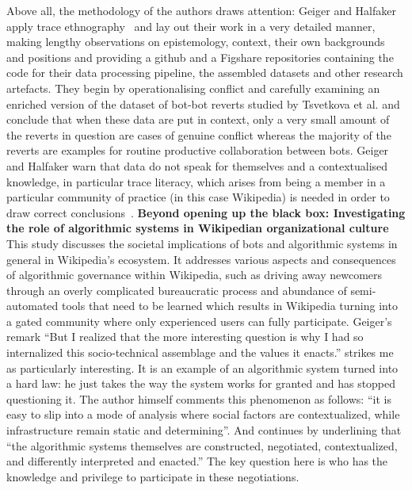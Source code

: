 \documentclass[pdftex,a4paper,11pt]{scrartcl}
\begin{document}
Above all, the methodology of the authors draws attention: Geiger and Halfaker apply trace ethnography~\cite{GeiRib2011} and lay out their work in a very detailed manner, making lengthy observations on epistemology, context, their own backgrounds and positions and providing a github and a Figshare repositories containing the code for their data processing pipeline, the assembled datasets and other research artefacts.
They begin by operationalising conflict and carefully examining an enriched version of the dataset of bot-bot reverts studied by Tsvetkova et al. and conclude that when these data are put in context, only a very small amount of the reverts in question are cases of genuine conflict whereas the majority of the reverts are examples for routine productive collaboration between bots.
Geiger and Halfaker warn that data do not speak for themselves and a contextualised knowledge, in particular trace literacy, which arises from being a member in a particular community of practice (in this case Wikipedia) is needed in order to draw correct conclusions~\cite{GeiHal2017}.
\newline
\newline
\textbf{Beyond opening up the black box: Investigating the role of algorithmic systems in Wikipedian organizational culture}~\cite{Geiger2017}
\newline
\newline
This study discusses the societal implications of bots and algorithmic systems in general in Wikipedia's ecosystem.
It addresses various aspects and consequences of algorithmic governance within Wikipedia, such as driving away newcomers through an overly complicated bureaucratic process and abundance of semi-automated tools that need to be learned which results in Wikipedia turning into a gated community where only experienced users can fully participate.
Geiger's remark
``But I realized that the more interesting question is why I had so internalized this socio-technical assemblage and the values it enacts.''
strikes me as particularly interesting.
It is an example of an algorithmic system turned into a hard law: he just takes the way the system works for granted and has stopped questioning it.
The author himself comments this phenomenon as follows:
``it is easy to slip into a mode of analysis where social factors are contextualized, while infrastructure remain static and determining''.
And continues by underlining that ``the algorithmic systems themselves are constructed, negotiated, contextualized, and differently interpreted and enacted.''
The key question here is who has the knowledge and privilege to participate in these negotiations.
\end{document}
